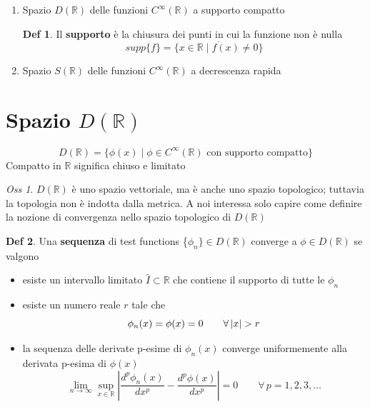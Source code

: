 \documentclass[a4paper,11pt]{report}
\theoremstyle{remark}
\newtheorem*{oss}{Oss}
\theoremstyle{definition}
\newtheorem*{Def}{Def}
\newcommand{\R}{\mathbb{R}}
\DeclarePairedDelimiter{\abs}{\lvert}{\rvert}
\begin{document}
\begin{enumerate}
	\item Spazio $D(\R)$ delle funzioni $C^\infty(\R)$ a supporto compatto
	\begin{Def}
		Il \textbf{supporto} è la chiusura dei punti in cui la funzione non è nulla
		\begin{equation*}
			supp\{f\}= \overline{\{x \in \R \; |\; f(x) \ne 0 \}}
		\end{equation*}
	\end{Def}
	\item Spazio $S(\R)$ delle funzioni $C^\infty(\R)$ a decrescenza rapida
\end{enumerate}

\section{Spazio \texorpdfstring{$D(\R)$}{U}}

\begin{equation*}
	D(\R) = \{\phi(x) \; | \; \phi \in C^\infty(\R) \text{ con supporto compatto}\}
\end{equation*}
Compatto in $\R$ significa chiuso e limitato

\begin{oss}
	$D(\R)$ è uno spazio vettoriale, ma è anche uno spazio topologico; tuttavia la topologia non è indotta dalla metrica. A noi interessa solo capire come definire la nozione di convergenza nello spazio topologico di $D(\R)$
\end{oss}

\begin{Def} \label{def: sequenza}
	Una \textbf{sequenza} di test functions \{$\phi_n\} \in D(\R)$ converge a $\phi \in D(\R)$ se valgono
	\begin{itemize}
		\item esiste un intervallo limitato $\hat{I} \subset \R$ che contiene il supporto di tutte le $\phi_n$
  		\item esiste un numero reale $r$ tale che 
		\begin{equation*}
			\phi_n(x) = \phi(x) =0 \qquad \forall \, \abs{x}>r 
		\end{equation*}
		\item la sequenza delle derivate p-esime di $\phi_n(x)$ converge uniformemente alla derivata p-esima di $\phi(x)$
		\begin{equation*}
			\lim_{n\to\infty} \sup_{x\in\R} \left|\frac{d^p\phi_n(x)}{dx^p}- \frac{d^p\phi(x)}{dx^p}\right| =0 \qquad \forall \, p=1,2,3,\dots
		\end{equation*}
	\end{itemize} 
\end{Def}
\end{document}
